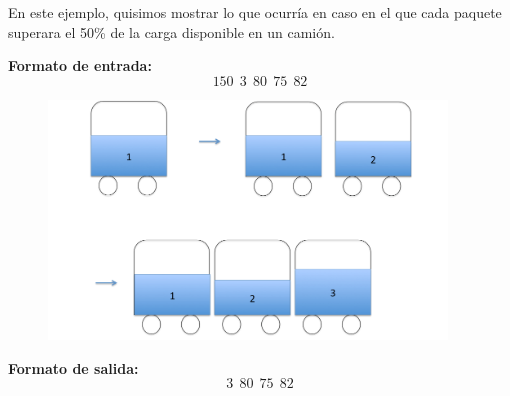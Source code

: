 \begin{itemize}
En este ejemplo, quisimos mostrar lo que ocurría en caso en el que cada paquete superara el 50\% de la carga disponible en un camión.\newline

\textbf{Formato de entrada:} 
$$150\ \ 3\ \ 80\ \ 75\ \ 82$$

\begin{figure}[H] %
\begin{center}
\includegraphics[width=300pt]{../imgs/ejemplo2.jpg}
\end{center}
\end{figure}

\textbf{Formato de salida:}
$$3\ \ 80\ \ 75\ \ 82$$


\end{itemize}
